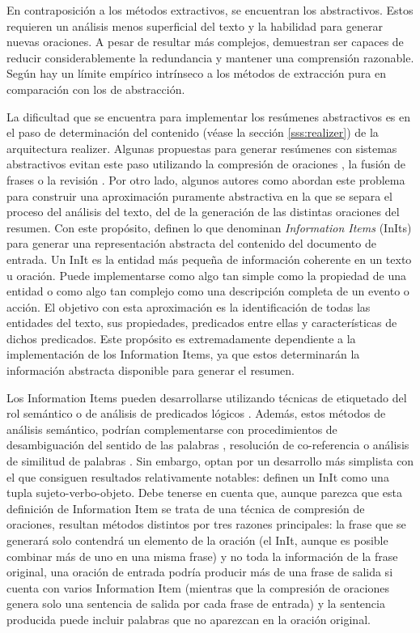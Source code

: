 En contraposición a los métodos extractivos, se encuentran los abstractivos. Estos requieren un análisis menos superficial del texto y la habilidad para generar nuevas oraciones. A pesar de resultar más complejos, demuestran ser capaces de reducir considerablemente la redundancia y mantener una comprensión razonable. Según \cite{genest2013hextac} hay un límite empírico intrínseco a los métodos de extracción pura en comparación con los de abstracción.

La dificultad que se encuentra para implementar los resúmenes abstractivos es en el paso de determinación del contenido (véase la sección \ref{sss:realizer}) de la arquitectura realizer. Algunas propuestas para generar resúmenes con sistemas abstractivos evitan este paso utilizando la compresión de oraciones \citep{knight2000statistics, cohn2009sentence}, la fusión de frases \citep{barzilay2005sentence} o la revisión \citep{tanaka2009syntax}. Por otro lado, algunos autores como \cite{genest2011framework} abordan este problema para construir una aproximación puramente abstractiva en la que se separa el proceso del análisis del texto, del de la generación de las distintas oraciones del resumen. Con este propósito, \cite{genest2011framework} definen lo que denominan \textit{Information Items} (InIts) para generar una representación abstracta del contenido del documento de entrada. Un InIt es la entidad más pequeña de información coherente en un texto u oración. Puede implementarse como algo tan simple como la propiedad de una entidad o como algo tan complejo como una descripción completa de un evento o acción. El objetivo con esta aproximación es la identificación de todas las entidades del texto, sus propiedades, predicados entre ellas y características de dichos predicados. Este propósito es extremadamente dependiente a la implementación de los Information Items, ya que estos determinarán la información abstracta disponible para generar el resumen.

Los Information Items pueden desarrollarse utilizando técnicas de etiquetado del rol semántico \citep{palmer2010semantic} o de análisis de predicados lógicos \citep{epstein2018predicate}. Además, estos métodos de análisis semántico, podrían complementarse con procedimientos de desambiguación del sentido de las palabras \citep{navigli2009word}, resolución de co-referencia \citep{soon2001machine} o análisis de similitud de palabras \citep{islam2008semantic}. Sin embargo, \cite{genest2011framework} optan por un desarrollo más simplista con el que consiguen resultados relativamente notables: definen un InIt como una tupla sujeto-verbo-objeto. Debe tenerse en cuenta que, aunque parezca que esta definición de Information Item se trata de una técnica de compresión de oraciones, resultan métodos distintos por tres razones principales: la frase que se generará solo contendrá un elemento de la oración (el InIt, aunque es posible combinar más de uno en una misma frase) y no toda la información de la frase original, una oración de entrada podría producir más de una frase de salida si cuenta con varios Information Item (mientras que la compresión de oraciones genera solo una sentencia de salida por cada frase de entrada) y la sentencia producida puede incluir palabras que no aparezcan en la oración original.

